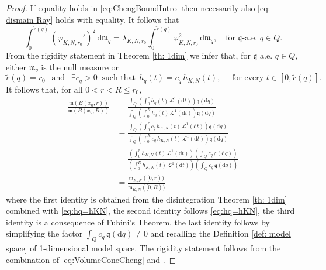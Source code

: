 \documentclass[12pt]{article}
\newcommand{\dd}{\mathrm{d}}
\newcommand{\mm}{\mathfrak m}
\theoremstyle{plain}
\theoremstyle{definition}
\begin{document}
\begin{proof}
If equality holds in \eqref{eq:ChengBoundIntro} then necessarily also \eqref{eq: dismain Ray} holds with equality. It follows that
\begin{equation*}
\int_0^{\tilde{r}(q)} (\varphi_{K,N,r_0}')^2\,\dd \mm_{q}=  \lambda_{K,N,r_0} \int_0^{\tilde{r}(q)}\varphi_{K,N,r_0}^2\,\dd \mm_{q}, \quad \text{for } \mathfrak{q}\text{-a.e. }q\in Q.
\end{equation*}
From the rigidity statement in Theorem \ref{th: 1dim} we infer that, for $\mathfrak{q}$ a.e. $q\in Q$, either  $\mm_{q}$ is the null measure or
\begin{equation}\label{eq:hq=hKN}
\tilde{r}(q)=r_0 \ \ \text{ and }  \ \ \exists c_q>0 \ \textrm{ such that} \ \ {h}_q(t) = c_q\, h_{K,N}(t), \quad \text{ for every } t\in [0,\tilde{r}(q)].
\end{equation}
It follows that, for all $0<r<R\leq r_0$,
%
\begin{equation}\label{eq:VolumeConeCheng}
\begin{split}
\frac{\mm(B(x_0, r))}{\mm(B(x_0, R))}
&= \frac{\int_Q\left(\int_0^{r}  h_q(t)\,\mathcal{L}^1(\dd t)\right)\mathfrak{q}(\dd q)} {\int_Q\left(\int_0^{R}  h_q(t)\, \mathcal{L}^1(\dd t)\right)\mathfrak{q}(\dd q)}   \\
& = \frac{\int_Q\left(\int_0^{r}   c_q\, h_{K,N}(t)\,\mathcal{L}^1(\dd t)\right)\mathfrak{q}(\dd q)} {\int_Q\left(\int_0^{R}  c_q\, h_{K,N}(t)\, \mathcal{L}^1(\dd t)\right)\mathfrak{q}(\dd q)}  \\
& = \frac{\left(\int_0^{r} h_{K,N}(t)\,\mathcal{L}^1(\dd t) \right) \left( \int_Q   c_q\, \mathfrak{q}(\dd q) \right)} {\left(\int_0^{R} h_{K,N}(t)\,\mathcal{L}^1(\dd t) \right) \left( \int_Q   c_q\, \mathfrak{q}(\dd q) \right)}  \\
&= \frac{\mm_{K,N}([0, r))}{\mm_{K,N}([0, R))}
\end{split}
\end{equation}
where the first identity is obtained from the disintegration Theorem \ref{th: 1dim} combined with \eqref{eq:hq=hKN}, the second identity follows \eqref{eq:hq=hKN}, the third identity is a consequence of Fubini's Theorem, the last identity follows by simplifying the factor $\int_Q   c_q\, \mathfrak{q}(\dd q)\neq 0$ and recalling the Definition \ref{def: model space} of 1-dimensional model space. The rigidity statement  follows from the combination of \eqref{eq:VolumeConeCheng} and \cite[Thm.]{DPG-GAFA}. 
\end{proof}
\end{document}
